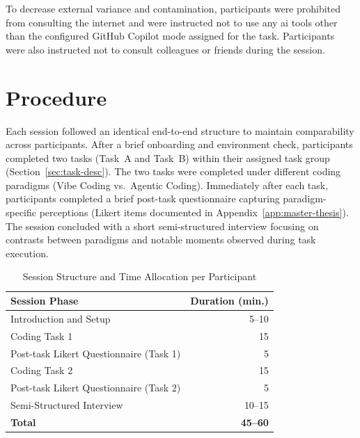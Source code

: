 To decrease external variance and contamination, participants were prohibited from consulting the internet and were instructed not to use any \gls{ai} tools other than the configured GitHub Copilot mode assigned for the task. Participants were also instructed not to consult colleagues or friends during the session.

\section{Procedure}
\label{sec:procedure}

Each session followed an identical end-to-end structure to maintain comparability across participants. After a brief onboarding and environment check, participants completed two tasks (Task~A and Task~B) within their assigned task group (Section~\ref{sec:task-desc}). The two tasks were completed under different coding paradigms (Vibe Coding vs.\ Agentic Coding). Immediately after each task, participants completed a brief post-task questionnaire capturing paradigm-specific perceptions (Likert items documented in Appendix~\ref{app:master-thesis}). The session concluded with a short semi-structured interview focusing on contrasts between paradigms and notable moments observed during task execution.

\begin{table}[ht]

  \centering

  \caption{Session Structure and Time Allocation per Participant}

  \label{tab:session-timing}

  \renewcommand{\arraystretch}{1.2}


  \begin{tabular}{p{11cm}r}

    \toprule

    \rowcolor{accentblue}

    \textbf{Session Phase} & \textbf{Duration (min.)} \\

    \midrule

    Introduction and Setup & 5--10 \\

    Coding Task 1 & 15 \\

    Post-task Likert Questionnaire (Task 1) & 5 \\

    Coding Task 2 & 15 \\

    Post-task Likert Questionnaire (Task 2) & 5 \\

    Semi-Structured Interview & 10--15 \\

    \midrule

    \textbf{Total} & \textbf{45--60} \\

    \bottomrule

  \end{tabular}

\end{table}

